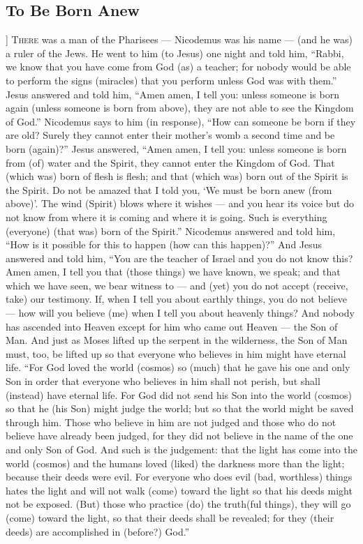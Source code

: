 \begin{pages}
\begin{Leftside}
        			\chapter{To Be Born Anew}
        			]
        		\renewcommand\LettrineFontHook{\Zallmanfamily}
		\lettrine[lines=3]{T}{here} was a man of the Pharisees — Nicodemus was his name — (and he was) a ruler of the Jews. He went to him (to Jesus) one night and told him, “Rabbi, we know that you have come from God (as) a teacher; for nobody would be able to perform the signs (miracles) that you perform unless God was with them.” Jesus answered and told him, “Amen amen, I tell you: unless someone is born again (unless someone is born from above), they are not able to see the Kingdom of God.” Nicodemus says to him (in response), “How can someone be born if they are old? Surely they cannot enter their mother’s womb a second time and be born (again)?” Jesus answered, “Amen amen, I tell you: unless someone is born from (of) water and the Spirit, they cannot enter the Kingdom of God. That (which was) born of flesh is flesh; and that (which was) born out of the Spirit is the Spirit. Do not be amazed that I told you, ‘We must be born anew (from above)’. The wind (Spirit) blows where it wishes — and you hear its voice but do not know from where it is coming and where it is going. Such is everything (everyone) (that was) born of the Spirit.” 
		\pend
		\pstart
		Nicodemus answered and told him, “How is it possible for this to happen (how can this happen)?” And Jesus answered and told him, “You are the teacher of Israel and you do not know this? Amen amen, I tell you that (those things) we have known, we speak; and that which we have seen, we bear witness to — and (yet) you do not accept (receive, take) our testimony. If, when I tell you about earthly things, you do not believe — how will you believe (me) when I tell you about heavenly things? And nobody has ascended into Heaven except for him who came out Heaven — the Son of Man. And just as Moses lifted up the serpent in the wilderness, the Son of Man must, too, be lifted up so that everyone who believes in him might have eternal life. 
		\pend
		\pstart
		“For God loved the world (cosmos) so (much) that he gave his one and only Son in order that everyone who believes in him shall not perish, but shall (instead) have eternal life. For God did not send his Son into the world (cosmos) so that he (his Son) might judge the world; but so that the world might be saved through him. Those who believe in him are not judged and those who do not believe have already been judged, for they did not believe in the name of the one and only Son of God. And such is the judgement: that the light has come into the world (cosmos) and the humans loved (liked) the darkness more than the light; because their deeds were evil. For everyone who does evil (bad, worthless) things hates the light and will not walk (come) toward the light so that his deeds might not be exposed. (But) those who practice (do) the truth(ful things), they will go (come) toward the light, so that their deeds shall be revealed; for they (their deeds) are accomplished in (before?) God.”

\end{Leftside}
\end{pages}
